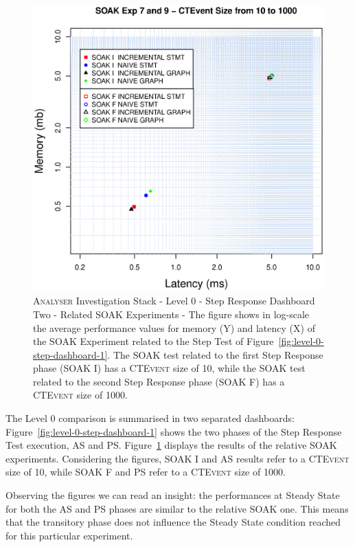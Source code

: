 \begin{figure}[htbp]
	\centering
	\includegraphics[width=0.90\linewidth]{images/level-0-step-dashboard-2}	
	\caption[\textsc{Analyser} Investigation Stack - Level 0 - Step Response Dashboard Two - Related SOAK Experiments]{
\textsc{Analyser} Investigation Stack - Level 0 - Step Response Dashboard Two - Related SOAK Experiments - The figure shows in log-scale the average performance values for memory (Y) and latency (X) of the SOAK Experiment related to the Step Test of Figure~\ref{fig:level-0-step-dashboard-1}. The SOAK test related to the first Step Response phase (SOAK I) has a \textsc{CTEvent} size of 10, while the SOAK test related to the second Step Response phase (SOAK F) has a \textsc{CTEvent} size of 1000.}
	\label{fig:level-0-step-dashboard-2}
\end{figure}

The Level 0 comparison is summarised in two separated dashboards: Figure~\ref{fig:level-0-step-dashboard-1} shows the two phases of the Step Response Test execution, AS and PS. Figure~\ref{fig:level-0-step-dashboard-2} displays the results of the relative SOAK experiments. Considering the figures, SOAK I and AS results refer to a \textsc{CTEvent} size of 10, while SOAK F and PS refer to a \textsc{CTEvent} size of 1000.

Observing the figures we can read an insight: the performances at Steady State for both the AS and PS phases are similar to the relative SOAK one. This means that the transitory phase does not influence the Steady State condition reached for this particular experiment.

